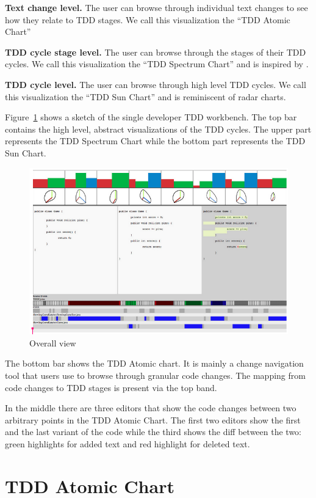 \documentclass[journal]{vgtc}                %
\begin{document}
\textbf{Text change level.} The user can browse through individual text changes to see how they relate to TDD stages. We call this visualization the ``TDD Atomic Chart''

\textbf{TDD cycle stage level.} The user can browse through the stages of their TDD cycles. We call this visualization the ``TDD Spectrum Chart'' and is inspired by \cite{one}.

\textbf{TDD cycle level.} The user can browse through high level TDD cycles. We call this visualization the ``TDD Sun Chart'' and is reminiscent of radar charts.

Figure~\ref{fig:one} shows a sketch of the single developer TDD workbench.
The top bar contains the high level, abstract visualizations of the TDD cycles. The upper part represents the TDD Spectrum Chart while the bottom part represents the TDD Sun Chart. 

\begin{figure}[hbt]
	\includegraphics[width=\textwidth]{fig1}
	\caption{Overall view}
\label{fig:one}
\end{figure}

The bottom bar shows the TDD Atomic chart. It is mainly a change navigation tool that users use to browse through granular code changes. The mapping from code changes to TDD stages is present via the top band.

In the middle there are three editors that show the code changes between two arbitrary points in the TDD Atomic Chart. The first two editors show the first and the last variant of the code while the third shows the diff between the two: green highlights for added text and red highlight for deleted text.

\section{TDD Atomic Chart}
\label{sec:atomic}
\end{document}
